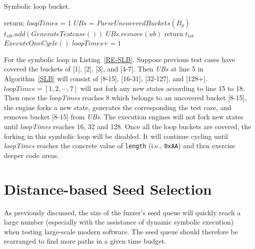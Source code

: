 \documentclass{cta-author}
\begin{document}
\begin{algorithm}
	\LinesNumbered
	\caption{Symbolic loop bucket.}
	\label{SLB}
	{
		return;
	}
	$loopTimes$ = 1\;
	$UBs$ = $ParseUncoveredBuckets(B_p)$\;
	{
		{
			{
				$t_{slb}.add(GenerateTestcase())$\;
				$UBs$.$remove(ub)$\;
			}
		}
		{
			return $t_{lsb}$\;
		}{
		$ExecuteOneCycle()$\;
		$loopTimes += 1$\;
	}
}
\end{algorithm}  

For the symbolic loop in Listing~\ref{RE-SLB}. Suppose previous 
test cases have covered the buckets of [1], [2], [3], and [4-7]. 
Then \textit{UBs} at line 5 in Algorithm~\ref{SLB} will consist of 
[8-15], [16-31], [32-127], and [128+]. 
$\textit{loopTimes}=[1, 2, \cdots, 7]$ will not fork any new states 
according to line 15 to 18. Then once the \textit{loopTimes} reaches 
8 which belongs to an uncovered bucket [8-15], the engine forks a 
new state,  generates the corresponding the test case, and removes 
bucket [8-15] from \textit{UBs}. The execution engines will not 
fork new states until \textit{loopTimes} reaches 16, 32 and 128. 
Once all the loop buckets are covered, the forking in this 
symbolic loop will be disabled. It will continue cycling until 
\textit{loopTimes} reaches the concrete value of \texttt{length} 
(i.e., \texttt{0xAA}) and then exercise deeper code areas.

\section{Distance-based Seed Selection} \label{sec:seed selection}
As previously discussed, the size of the fuzzer's seed queue will quickly 
reach a large number (especially with the assistance of dynamic symbolic 
execution) when testing large-scale modern software. The seed queue should 
therefore be rearranged to find more paths in a given time budget.
\end{document}
